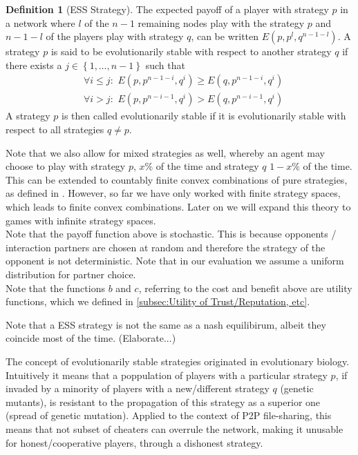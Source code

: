\documentclass[11pt,a4paper]{report}
\theoremstyle{definition}
\newtheorem{definition}{Definition}[section]
\theoremstyle{theorem}
\theoremstyle{proposition}
\theoremstyle{corollary}
\theoremstyle{lemma}
\theoremstyle{example}
\theoremstyle{remark}
\begin{document}
\begin{definition}[ESS Strategy]
The expected payoff of a player with strategy $p$ in a network where $l$ of the $n-1$ remaining nodes play with the strategy $p$ and $n-1-l$ of the players play with strategy $q$, can be written $E(p,p^l,q^{n-1-l})$. A strategy $p$ is said to be evolutionarily stable with respect to another strategy $q$ if there exists a $j\in\left\lbrace{}1,\ldots,n-1\right\rbrace$ such that
\begin{align}
&\forall{}i\leq{}j:\,\,E(p,p^{n-1-i},q^i)\geq{}E(q,p^{n-1-i},q^i)\\
&\forall{}i>j:\,\,E(p,p^{n-i-1},q^i) > E(q,p^{n-i-1},q^i)
\end{align}
A strategy $p$ is then called evolutionarily stable if it is evolutionarily stable with respect to all strategies $q\neq{}p$. 
\end{definition}
Note that we also allow for mixed strategies as well, whereby an agent may choose to play with strategy $p$, $x\%$ of the time and strategy $q$ $1-x\%$ of the time. This can be extended to countably finite convex combinations of pure strategies, as defined in \cite{Game Theory}. However, so far we have only worked with finite strategy spaces, which leads to finite convex combinations. Later on we will expand this theory to games with infinite strategy spaces.\vspace{1em}\\
\noindent{} Note that the payoff function above is stochastic. This is because opponents / interaction partners are chosen at random and therefore the strategy of the opponent is not deterministic. Note that in our evaluation we assume a uniform distribution for partner choice. \vspace{1em}\\

\noindent{} Note that the functions $b$ and $c$, referring to the cost and benefit above are utility functions, which we defined in \ref{subsec:Utility of Trust/Reputation, etc}.  
	
\noindent{} Note that a ESS strategy is not the same as a nash equilibirum, albeit they coincide most of the time. (Elaborate...)

\noindent{} The concept of evolutionarily stable strategies originated in evolutionary biology. Intuitively it means that a poppulation of players with a particular strategy $p$, if invaded by a minority of players with a new/different strategy $q$ (genetic mutants), is resistant to the propagation of this strategy as a superior one (spread of genetic mutation). Applied to the context of P2P file-sharing, this means that not subset of cheaters can overrule the network, making it unusable for honest/cooperative players, through a dishonest strategy.\vspace{1em}\\  
\end{document}
